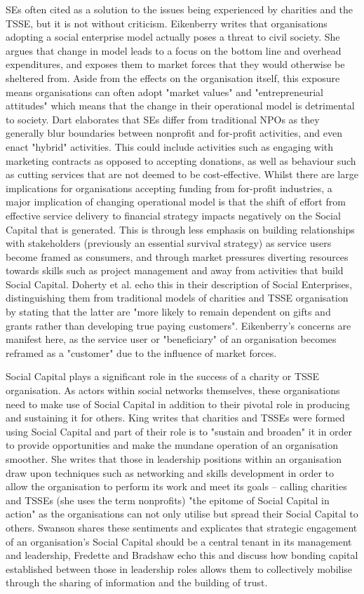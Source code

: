 SEs often cited as a solution to the issues being experienced by charities and the TSSE, but it is not without criticism. Eikenberry writes that organisations adopting a social enterprise model actually poses a threat to civil society. She argues that change in model leads to a focus on the bottom line and overhead expenditures, and exposes them to market forces that they would otherwise be sheltered from. Aside from the effects on the organisation itself, this exposure means organisations can often adopt "market values" and "entrepreneurial attitudes" which means that the change in their operational model is detrimental to society. Dart elaborates that SEs differ from traditional NPOs as they generally blur boundaries between nonprofit and for-profit activities, and even enact "hybrid" activities. This could include activities such as engaging with marketing contracts as opposed to accepting donations, as well as behaviour such as cutting services that are not deemed to be cost-effective. Whilst there are large implications for organisations accepting funding from for-profit industries, a major implication of changing operational model is that the shift of effort from effective service delivery to financial strategy impacts negatively on the Social Capital that is generated. This is through less emphasis on building relationships with stakeholders (previously an essential survival strategy) as service users become framed as consumers, and through market pressures diverting resources towards skills such as project management and away from activities that build Social Capital. Doherty et al. echo this in their description of Social Enterprises, distinguishing them from traditional models of charities and TSSE organisation by stating that the latter are "more likely to remain dependent on gifts and grants rather than developing true paying customers". Eikenberry's concerns are manifest here, as the service user or "beneficiary" of an organisation becomes reframed as a "customer" due to the influence of market forces.

Social Capital plays a significant role in the success of a charity or TSSE organisation. As actors within social networks themselves, these organisations need to make use of Social Capital in addition to their pivotal role in producing and sustaining it for others. King writes that charities and TSSEs were formed using Social Capital and part of their role is to "sustain and broaden" it in order to provide opportunities and make the mundane operation of an organisation smoother. She writes that those in leadership positions within an organisation draw upon techniques such as networking and skills development in order to allow the organisation to perform its work and meet its goals -- calling charities and TSSEs (she uses the term nonprofits) "the epitome of Social Capital in action" as the organisations can not only utilise but spread their Social Capital to others. Swanson shares these sentiments and explicates that strategic engagement of an organisation's Social Capital should be a central tenant in its management and leadership, Fredette and Bradshaw echo this and discuss how bonding capital established between those in leadership roles allows them to collectively mobilise through the sharing of information and the building of trust.

